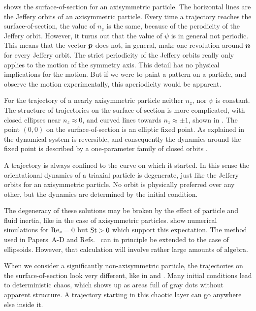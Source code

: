\documentclass[thesis.tex]{subfiles}
\begin{document}
 shows the surface-of-section for an axisymmetric particle. The horizontal lines are the Jeffery orbits of an axisymmetric particle. Every time a trajectory reaches the surface-of-section, the value of $n_z$ is the same, because of the perodicity of the Jeffery orbit. However, it turns out that the value of $\psi$ is in general not periodic. This means that the vector $\mbox{\boldmath$p$}$ does not, in general, make one revolution around $\mbox{\boldmath$n$}$ for every Jeffery orbit. The strict periodicity of the Jeffery orbits really only applies to the motion of the symmetry axis. This detail has no physical implications for the motion. But if we were to paint a pattern on a particle, and observe the motion experimentally, this aperiodicity would be apparent.

For the trajectory of a nearly axisymmetric particle neither $n_z$, nor $\psi$ is constant. The structure of trajectories on the surface-of-section is more complicated, with closed ellipses near $n_z\approx 0$, and curved lines towards $n_z\approx\pm 1$, shown in .
The point $(0,0)$ on the surface-of-section is an elliptic fixed point. As explained in  the dynamical system  is reversible, and consequently the dynamics around the fixed point is described by a one-parameter family of closed orbits \cite{lamb1998}.

A trajectory is always confined to the curve on which it started. In this sense the orientational dynamics of a triaxial particle is degenerate, just like the Jeffery orbits for an axisymmetric particle. No orbit is physically preferred over any other, but the dynamics are determined by the initial condition.

The degeneracy of these solutions may be broken by the effect of particle and fluid inertia, like in the case of axisymmetric particles. \citet{lundell2011} show numerical simulations for $\textrm{Re}_s=0$ but $\mbox{St}>0$ which support this expectation. The method used in Papers~A-D and Refs.~\cite{subramanian2005,subramanian2006} can in principle be extended to the case of ellipsoids. However, that calculation will involve rather large amounts of algebra.

When we consider a significantly non-axisymmetric particle, the trajectories on the surface-of-section look very different, like in  and . Many initial conditions lead to deterministic chaos, which shows up as areas full of gray dots without apparent structure. A trajectory starting in this chaotic layer can go anywhere else inside it. 
\end{document}

